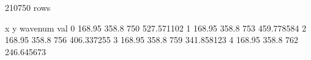 \documentclass[letterpaper,10pt,english]{sphinxmanual}
\begin{document}
\begin{sphinxVerbatim}[commandchars=\\\{\}]
  
\PYG{p}{[}\PYG{p}{]} 
\end{sphinxVerbatim}

\begin{sphinxVerbatim}[commandchars=\\\{\}]
210750 rows
\end{sphinxVerbatim}

\begin{sphinxVerbatim}[commandchars=\\\{\}]
        x      y  wavenum         val
0  168.95  358.8      750  527.571102
1  168.95  358.8      753  459.778584
2  168.95  358.8      756  406.337255
3  168.95  358.8      759  341.858123
4  168.95  358.8      762  246.645673
\end{sphinxVerbatim}
\end{document}

